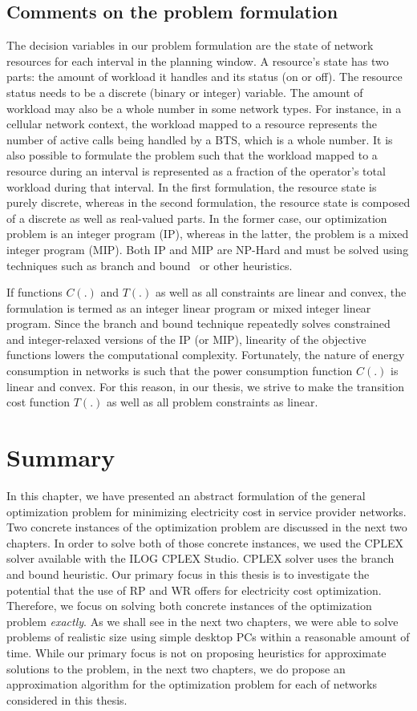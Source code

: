 \subsection{Comments on the problem formulation}
The decision variables in our problem formulation are the state of network resources for each interval in the planning window. A resource's state has two parts: the amount of workload it handles and its status (on or off). The resource status needs to be a discrete (binary or integer) variable. The amount of workload may also be a whole number in some network types. For instance, in a cellular network context, the workload mapped to a resource represents the number of active calls being handled by a BTS, which is a whole number. It is also possible to formulate the problem such that the workload mapped to a resource during an interval is represented as a fraction of the operator's total workload during that interval. In the first formulation, the resource state is purely discrete, whereas in the second formulation, the resource state is composed of a discrete as well as real-valued parts. In the former case, our optimization problem is an integer program (IP), whereas in the latter, the problem is a mixed integer program (MIP). Both IP and MIP are NP-Hard and must be solved using techniques such as branch and bound~\cite{land60a} or other heuristics. 

If functions $C(.)$ and $T(.)$ as well as all constraints are linear and convex, the formulation is termed as an integer linear program or mixed integer linear program. Since the branch and bound technique repeatedly solves constrained and integer-relaxed versions of the IP (or MIP), linearity of the objective functions lowers the computational complexity. Fortunately, the nature of energy consumption in networks is such that the power consumption function $C(.)$ is linear and convex. For this reason, in our thesis, we strive to make the transition cost function $T(.)$ as well as all problem constraints as linear.

\section{Summary}
In this chapter, we have presented an abstract formulation of the general optimization problem for minimizing electricity cost in service provider networks. Two concrete instances of the optimization problem are discussed in the next two chapters. In order to solve both of those concrete instances, we used the CPLEX solver available with the ILOG CPLEX Studio. CPLEX solver uses the branch and bound heuristic. Our primary focus in this thesis is to investigate the potential that the use of RP and WR offers for electricity cost optimization. Therefore, we focus on solving both concrete instances of the optimization problem \textit{exactly}. As we shall see in the next two chapters, we were able to solve problems of realistic size using simple desktop PCs within a reasonable amount of time. While our primary focus is not on proposing heuristics for approximate solutions to the problem, in the next two chapters, we do propose an approximation algorithm for the optimization problem for each of networks considered in this thesis. 